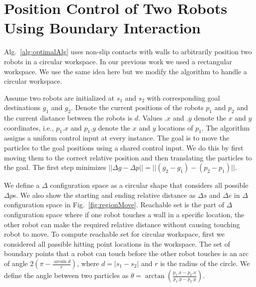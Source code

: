 

\section{Position Control of Two Robots Using Boundary Interaction}\label{sec:PostionControl2Robots}


Alg.~\ref{alg:optimalAlg} uses non-slip contacts with walls to arbitrarily position two robots in a circular workspace. In our previous work we used a rectangular workspace. We use the same idea here but we modify the algorithm to handle a circular workspace.

Assume two robots are initialized at $s_1$ and $s_2$ with corresponding goal destinations $g_1$ and $g_2$. 
Denote the current positions of the robots  $p_1$ and $p_2$ and the current distance between the robots is $d$.
Values $.x$ and $.y$ denote the $x$ and $y$ coordinates, i.e., $p_1.x$ and $p_1.y$ denote the $x$ and $y$ locations of $p_1$. 
The algorithm assigns a uniform control input at every instance.
The goal is to move the particles to the goal positions using a shared control input. We do this by first moving them to the correct relative position and then translating the particles to the goal. The first step minimizes  
 $||\Delta g - \Delta p || = ||(g_2-g_1)- (p_2-p_1)||$. 
 
 We define a $\Delta$ configuration space as a circular shape that considers all possible $\Delta p$s. We also show the starting and ending relative distance as $\Delta s$ and $\Delta e$ in $\Delta$ configuration space in Fig.~\ref{fig:regionMove}. Reachable set is the part of $\Delta$ configuration space where if one robot touches a wall in a specific location, the other robot can make the required relative distance without causing touching robot to move. To compute reachable set for circular workspace, first we considered all passible hitting point locations in the workspace. 
 The set of boundary points that a robot can touch before the  other robot  touches is an arc of angle $2(\pi - \frac{\arcsin{d}}{r})$, where $d= |s_1 - s_2|$ and $r$ is the radius of the circle.
 We define the angle between two particles as $\theta = \arctan(\frac{p_1.x-p_2.x}{p_1.y - p_2.y})$. 
 
